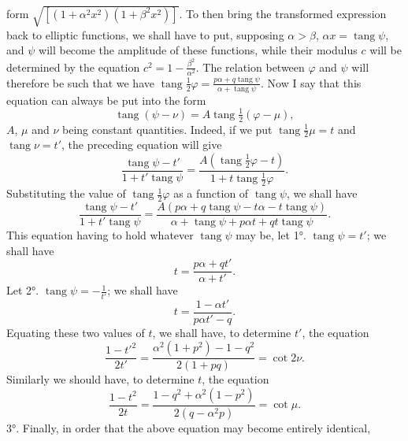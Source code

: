 \documentclass{article}
\begin{document}
form $\sqrt{[(1+\alpha^{2}x^{2})(1+\beta^{2}x^{2})]}$. To then bring the transformed expression back to elliptic functions, we shall have to put, supposing $\alpha>\beta$, $\alpha x=\operatorname{tang}\psi$, and $\psi$ will become the amplitude of these functions, while their modulus $c$ will be determined by the equation $c^{2}=1-\frac{\beta^{2}}{\alpha^{2}}$. The relation between $\varphi$ and $\psi$ will therefore be such that we have $\operatorname{tang}\frac{1}{2}\varphi=\frac{p\alpha+q\operatorname{tang}\psi}{\alpha+\operatorname{tang}\psi}$. Now I say that this equation can always be put into the form
\[ \operatorname{tang}(\psi-\nu)=A\operatorname{tang}\tfrac{1}{2}(\varphi-\mu), \]
$A$, $\mu$ and $\nu$ being constant quantities. Indeed, if we put $\operatorname{tang}\frac{1}{2}\mu=t$ and $\operatorname{tang}\nu=t'$, the preceding equation will give
\[ \frac{\operatorname{tang}\psi-t'}{1+t'\operatorname{tang}\psi}=\frac{A(\operatorname{tang}\tfrac{1}{2}\varphi-t)}{1+t\operatorname{tang}\tfrac{1}{2}\varphi}. \]
Substituting the value of $\operatorname{tang}\frac{1}{2}\varphi$ as a function of $\operatorname{tang}\psi$, we shall have
\[ \frac{\operatorname{tang}\psi-t'}{1+t'\operatorname{tang}\psi}=\frac{A(p\alpha+q\operatorname{tang}\psi-t\alpha-t\operatorname{tang}\psi)}{\alpha+\operatorname{tang}\psi+p\alpha t+qt\operatorname{tang}\psi}. \]
This equation having to hold whatever $\operatorname{tang}\psi$ may be, let 1°. $\operatorname{tang}\psi=t'$; we shall have
\[ t=\frac{p\alpha+qt'}{\alpha+t'}. \]
Let 2°. $\operatorname{tang}\psi=-\frac{1}{t'}$; we shall have
\[ t=\frac{1-\alpha t'}{p\alpha t'-q}. \]
Equating these two values of $t$, we shall have, to determine $t'$, the equation
\[ \frac{1-t'^{2}}{2t'}=\frac{\alpha^{2}(1+p^{2})-1-q^{2}}{2(1+pq)}=\cot2\nu. \]
Similarly we should have, to determine $t$, the equation
\[ \frac{1-t^{2}}{2t}=\frac{1-q^{2}+\alpha^{2}(1-p^{2})}{2(q-\alpha^{2}p)}=\cot\mu. \]
3°. Finally, in order that the above equation may become entirely identical,
\end{document}
